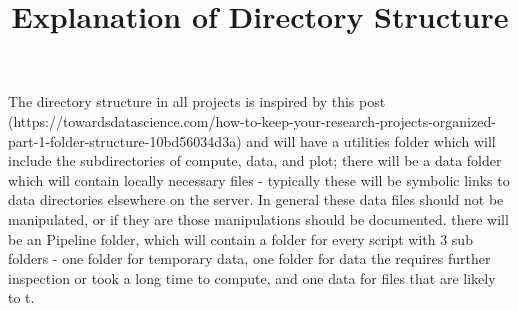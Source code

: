 \documentclass[11pt]{amsart}
\title{Explanation of Directory Structure}
\begin{document}
\maketitle
The directory structure in all projects is inspired by this post (https://towardsdatascience.com/how-to-keep-your-research-projects-organized-part-1-folder-structure-10bd56034d3a) and will have a utilities folder which will include the subdirectories of compute, data, and plot; there will be a data folder which will contain locally necessary files - typically these will be symbolic links to data directories elsewhere on the server. In general these data files should not be manipulated, or if they are those manipulations should be documented. there will be an Pipeline folder, which will contain a folder for every script with 3 sub folders - one folder for temporary data, one folder for data the requires further inspection or took a long time to compute, and one data for files that are likely to t.
\end{document}
